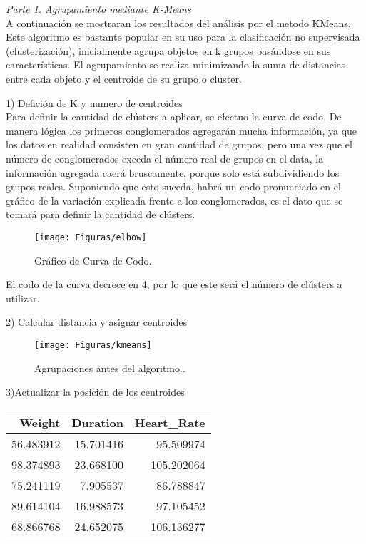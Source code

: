 \documentclass[5p,times,authoryear]{sciarticle}
\begin{document}
\begin{multicols}{2}
{\emph {Parte 1. Agrupamiento mediante K-Means } \\
A continuación se mostraran los resultados del análisis por el metodo KMeans. Este algoritmo es bastante popular en su uso para la clasificación no supervisada (clusterización), inicialmente agrupa objetos en k grupos basándose en sus características. El agrupamiento se realiza minimizando la suma de distancias entre cada objeto y el centroide de su grupo o cluster. 

1) {Defición de K y numero de centroides} \\
Para definir la cantidad de clústers a aplicar, se efectuo la curva de codo. De manera lógica los primeros conglomerados agregarán mucha información, ya que los datos en realidad consisten en gran cantidad de grupos, pero una vez que el número de conglomerados exceda el número real de grupos en el data, la información agregada caerá bruscamente, porque solo está subdividiendo los grupos reales. Suponiendo que esto suceda, habrá un codo pronunciado en el gráfico de la variación explicada frente a los conglomerados, es el dato que se tomará para definir la cantidad de clústers.

\begin{figure}[H]
\centering
  \texttt{[image: Figuras/elbow]}\\
  \caption{Gráfico de Curva de Codo. }\label{fig1}
\end{figure}

El codo de la curva decrece en 4, por lo que este será el número de clústers a utilizar.

2) {Calcular distancia y asignar centroides} \\
\begin{figure}[H]
\centering
  \texttt{[image: Figuras/kmeans]}\\
  \caption{Agrupaciones antes del algoritmo..}\label{fig1}
\end{figure}

3){Actualizar la posición de los centroides} \\
\begin{tabular}{rrr}
\toprule
   Weight &  Duration &  Heart\_Rate \\
\midrule
56.483912 & 15.701416 &   95.509974 \\
98.374893 & 23.668100 &  105.202064 \\
75.241119 &  7.905537 &   86.788847 \\
89.614104 & 16.988573 &   97.105452 \\
68.866768 & 24.652075 &  106.136277 \\
\bottomrule
\end{tabular}\\

}
\end{multicols}
\end{document}
